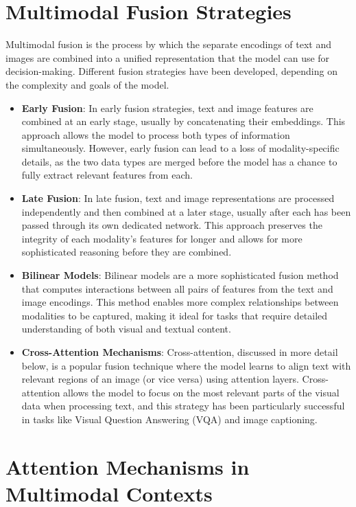 \section{Multimodal Fusion Strategies}

Multimodal fusion is the process by which the separate encodings of text and images are combined into a unified representation that the model can use for decision-making. Different fusion strategies have been developed, depending on the complexity and goals of the model.

\begin{itemize}
    \item \textbf{Early Fusion}: In early fusion strategies, text and image features are combined at an early stage, usually by concatenating their embeddings. This approach allows the model to process both types of information simultaneously. However, early fusion can lead to a loss of modality-specific details, as the two data types are merged before the model has a chance to fully extract relevant features from each.
    \item \textbf{Late Fusion}: In late fusion, text and image representations are processed independently and then combined at a later stage, usually after each has been passed through its own dedicated network. This approach preserves the integrity of each modality’s features for longer and allows for more sophisticated reasoning before they are combined.
    \item \textbf{Bilinear Models}: Bilinear models are a more sophisticated fusion method that computes interactions between all pairs of features from the text and image encodings. This method enables more complex relationships between modalities to be captured, making it ideal for tasks that require detailed understanding of both visual and textual content.
    \item \textbf{Cross-Attention Mechanisms}: Cross-attention, discussed in more detail below, is a popular fusion technique where the model learns to align text with relevant regions of an image (or vice versa) using attention layers. Cross-attention allows the model to focus on the most relevant parts of the visual data when processing text, and this strategy has been particularly successful in tasks like Visual Question Answering (VQA) and image captioning.
\end{itemize}

\section{Attention Mechanisms in Multimodal Contexts}

